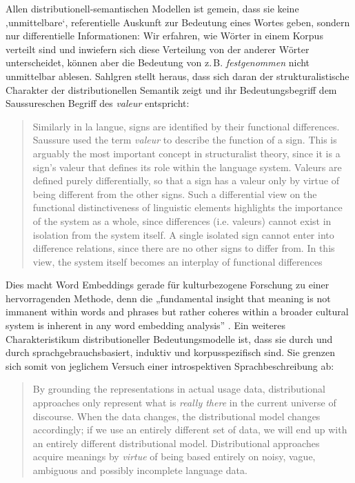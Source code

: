 Allen distributionell-semantischen Modellen ist gemein, dass sie keine ‚unmittelbare`, referentielle Auskunft zur Bedeutung eines Wortes geben, sondern nur differentielle Informationen: Wir erfahren, wie Wörter in einem Korpus verteilt sind und inwiefern sich diese Verteilung von der anderer Wörter unterscheidet, können aber die Bedeutung von z.\,B. \emph{festgenommen} nicht unmittelbar ablesen. Sahlgren stellt heraus, dass sich daran der strukturalistische Charakter der distributionellen Semantik zeigt und ihr Bedeutungsbegriff dem Saussureschen Begriff des \emph{valeur} entspricht:
\largerpage[-2]
\begin{quote}
Similarly in la langue, signs are identified by their functional differences. Saussure used the term \emph{valeur} to describe the function of a sign. This is arguably the most important concept in structuralist theory, since it is a sign's valeur that defines its role within the language system. Valeurs are defined purely differentially, so that a sign has a valeur only by virtue of being different from the other signs. Such a differential view on the functional distinctiveness of linguistic elements highlights the importance of the system as a whole, since differences (i.e. valeurs) cannot exist in isolation from the system itself. A single isolated sign cannot enter into difference relations, since there are no other signs to differ from. In this view, the system itself becomes an interplay of functional differences \autocite[38]{sahlgrenDistributionalHypothesis2008}
\end{quote}

Dies macht Word Embeddings gerade für kulturbezogene Forschung zu einer hervorragenden Methode, denn die „fundamental insight that meaning is not immanent within words and phrases but rather coheres within a broader cultural system is inherent in any word embedding analysis'' \autocite[914]{kozlowskiGeometryCultureAnalyzing2019}. Ein weiteres Charakteristikum distributioneller Bedeutungsmodelle ist, dass sie durch und durch sprachgebrauchsbasiert, induktiv und korpusspezifisch sind. Sie grenzen sich somit von jeglichem Versuch einer introspektiven Sprachbeschreibung ab:

\begin{quote}
By grounding the representations in actual usage data, distributional approaches only represent what is \emph{really there} in the current universe of discourse. When the data changes, the distributional model changes accordingly; if we use an entirely different set of data, we will end up with an entirely different distributional model. Distributional approaches acquire meanings by \emph{virtue} of being based entirely on noisy, vague, ambiguous and possibly incomplete language data. \autocite[50]{sahlgrenDistributionalHypothesis2008}
\end{quote}

